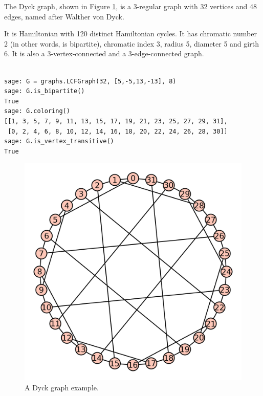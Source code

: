 \begin{example}
\label{example:graph-coloring:dyck-graph-example}
The Dyck graph, shown in Figure \ref{fig:graph-coloring:dyck-graph-example},
is a 3-regular graph with 32 vertices and 48 edges, 
named after Walther von Dyck.

It is Hamiltonian with 120 distinct Hamiltonian cycles. It has
chromatic number 2 (in other words, is bipartite), 
chromatic index 3, radius 5, diameter 5 and girth
6. It is also a 3-vertex-connected and a 3-edge-connected graph.

\begin{verbatim}

sage: G = graphs.LCFGraph(32, [5,-5,13,-13], 8) 
sage: G.is_bipartite()
True
sage: G.coloring()
[[1, 3, 5, 7, 9, 11, 13, 15, 17, 19, 21, 23, 25, 27, 29, 31], 
 [0, 2, 4, 6, 8, 10, 12, 14, 16, 18, 20, 22, 24, 26, 28, 30]]
sage: G.is_vertex_transitive()
True

\end{verbatim}


\begin{figure}[!htbp]
\centering
{}
\includegraphics{image/graph-coloring/dyck-graph-example}
\caption{A Dyck graph example.}
\label{fig:graph-coloring:dyck-graph-example}
\end{figure}

\end{example}


